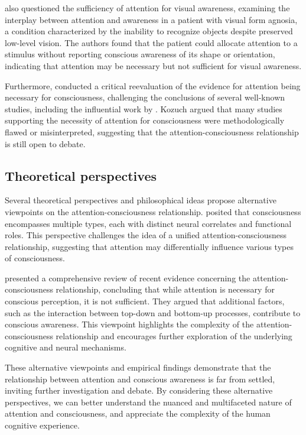 \documentclass[10pt]{article}
\begin{document}
\begin{sloppypar}
  \cite{kentridge_attended_2008} also questioned the sufficiency of attention for visual awareness, examining the interplay between attention and awareness in a patient with visual form agnosia, a condition characterized by the inability to recognize objects despite preserved low-level vision. The authors found that the patient could allocate attention to a stimulus without reporting conscious awareness of its shape or orientation, indicating that attention may be necessary but not sufficient for visual awareness.

  Furthermore, \cite{kozuch_gorillas_2019} conducted a critical reevaluation of the evidence for attention being necessary for consciousness, challenging the conclusions of several well-known studies, including the influential work by \cite{cohen_attentional_2012}. Kozuch argued that many studies supporting the necessity of attention for consciousness were methodologically flawed or misinterpreted, suggesting that the attention-consciousness relationship is still open to debate.

  \subsection{Theoretical perspectives}
  \label{sec:theoretical_alt}

  Several theoretical perspectives and philosophical ideas propose alternative viewpoints on the attention-consciousness relationship. \cite{montemayor_types_2021} posited that consciousness encompasses multiple types, each with distinct neural correlates and functional roles. This perspective challenges the idea of a unified attention-consciousness relationship, suggesting that attention may differentially influence various types of consciousness.

  \cite{noah_recent_2020} presented a comprehensive review of recent evidence concerning the attention-consciousness relationship, concluding that while attention is necessary for conscious perception, it is not sufficient. They argued that additional factors, such as the interaction between top-down and bottom-up processes, contribute to conscious awareness. This viewpoint highlights the complexity of the attention-consciousness relationship and encourages further exploration of the underlying cognitive and neural mechanisms.

  These alternative viewpoints and empirical findings demonstrate that the relationship between attention and conscious awareness is far from settled, inviting further investigation and debate. By considering these alternative perspectives, we can better understand the nuanced and multifaceted nature of attention and consciousness, and appreciate the complexity of the human cognitive experience.


\end{sloppypar}
\end{document}
